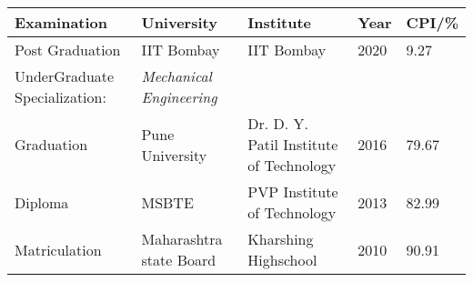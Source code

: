 \documentclass[a4paper,10pt]{article}
\newcommand{\lsep}{-0.5cm}
\newcommand{\resheading}[1]{{\small
        {
            \begin{minipage}
                {0.992\textwidth}\textbf{{\textsc{#1 \vphantom{p\^{E}} }}}
                \\[-0.3cm]
                \hrule
            \end{minipage}
            \\[-0.5cm]
        }
 }}
\begin{document}
\noindent\begin{tabular}{ l @{\hskip 0.15in} l @{\hskip 0.15in} l @{\hskip 0.15in} l @{\hskip 0.15in} l }
\hline
\textbf{Examination} & \textbf{University} & \textbf{Institute} & \textbf{Year} &                \hspace{1cm} \textbf{CPI/\%} \\
[0.1cm]
\hline
Post Graduation & IIT Bombay & IIT Bombay & 2020 &  \hspace{1cm} 9.27 \\
UnderGraduate Specialization: & \textit{Mechanical Engineering} \\
Graduation & Pune University & Dr. D. Y. Patil Institute of Technology & 2016 &  \hspace{1cm} 79.67\\
Diploma & MSBTE & PVP Institute of Technology &2013 &  \hspace{1cm} 82.99\\
Matriculation  & Maharashtra state Board & Kharshing Highschool &2010 &  \hspace{1cm} 90.91
\\[0.0001cm]
\hline
\end{tabular}
\hspace{0.5cm}\\
\hspace{0.5cm}\\
\hspace{0.5cm}\\
\hspace{0.5cm}\\
\hspace{0.5cm}\\
\hspace{0.5cm}\\
\hspace{0.5cm}\\
\hspace{0.5cm}\\
\hspace{0.5cm}\\
\hspace{0.5cm}\\
\hspace{0.5cm}\\
\hspace{0.5cm}\\
\hspace{0.5cm}\\[-0.2cm]
\vspace{-5.0cm}
\end{document}
